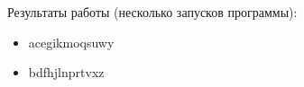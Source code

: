 Результаты работы (несколько запусков программы): 
\begin{itemize}
	\item acegikmoqsuwy
	\item bdfhjlnprtvxz
\end{itemize}











